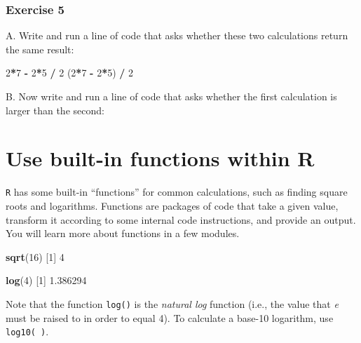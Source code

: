 \documentclass[
]{book}
\newenvironment{Shaded}{\begin{snugshade}}{\end{snugshade}}
\newcommand{\DecValTok}[1]{\textcolor[rgb]{0.00,0.00,0.81}{#1}}
\newcommand{\FloatTok}[1]{\textcolor[rgb]{0.00,0.00,0.81}{#1}}
\newcommand{\KeywordTok}[1]{\textcolor[rgb]{0.13,0.29,0.53}{\textbf{#1}}}
\newcommand{\NormalTok}[1]{#1}
\newcommand{\OperatorTok}[1]{\textcolor[rgb]{0.81,0.36,0.00}{\textbf{#1}}}
\newcommand{\StringTok}[1]{\textcolor[rgb]{0.31,0.60,0.02}{#1}}
\begin{document}
\hypertarget{exercise-5}{%
\subsubsection*{Exercise 5}\label{exercise-5}}

A. Write and run a line of code that asks whether these two calculations return the same result:

\begin{Shaded}
\begin{Highlighting}[]
\DecValTok{2}\OperatorTok{*}\DecValTok{7} \OperatorTok{-}\StringTok{ }\DecValTok{2}\OperatorTok{*}\DecValTok{5} \OperatorTok{/}\StringTok{ }\DecValTok{2}
\NormalTok{(}\DecValTok{2}\OperatorTok{*}\DecValTok{7} \OperatorTok{-}\StringTok{ }\DecValTok{2}\OperatorTok{*}\DecValTok{5}\NormalTok{) }\OperatorTok{/}\StringTok{ }\DecValTok{2}
\end{Highlighting}
\end{Shaded}

B. Now write and run a line of code that asks whether the first calculation is larger than the second:

\hypertarget{use-built-in-functions-within-r}{%
\section*{Use built-in functions within R}\label{use-built-in-functions-within-r}}

\texttt{R} has some built-in ``functions'' for common calculations, such as finding square roots and logarithms. Functions are packages of code that take a given value, transform it according to some internal code instructions, and provide an output. You will learn more about functions in a few modules.

\begin{Shaded}
\begin{Highlighting}[]
\KeywordTok{sqrt}\NormalTok{(}\DecValTok{16}\NormalTok{)}
\NormalTok{[}\DecValTok{1}\NormalTok{] }\DecValTok{4}

\KeywordTok{log}\NormalTok{(}\DecValTok{4}\NormalTok{)}
\NormalTok{[}\DecValTok{1}\NormalTok{] }\FloatTok{1.386294}
\end{Highlighting}
\end{Shaded}

Note that the function \texttt{log()} is the \emph{natural log} function (i.e., the value that \emph{e} must be raised to in order to equal 4). To calculate a base-10 logarithm, use \texttt{log10(\ )}.
\end{document}
